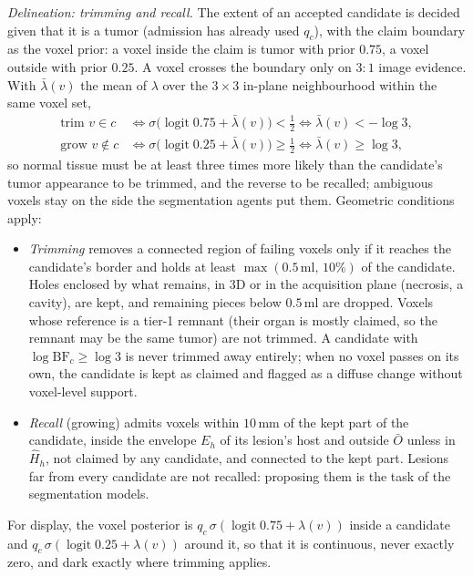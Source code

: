 \documentclass[fleqn,10pt]{olplainarticle}
\begin{document}
\textit{Delineation: trimming and recall.} The extent of an accepted candidate is decided given that it is a tumor
(admission has already used $q_c$), with the claim boundary as the voxel prior: a voxel inside the claim is tumor with
prior $0.75$, a voxel outside with prior $0.25$. A voxel crosses the boundary only on $3{:}1$ image evidence. With
$\bar\lambda(v)$ the mean of $\lambda$ over the $3\times3$ in-plane neighbourhood within the same voxel set,
\begin{equation}
\label{eq:delineation}
\begin{aligned}
\text{trim } v\in c &\iff \sigma\bigl(\operatorname{logit}0.75+\bar\lambda(v)\bigr)<\tfrac12 \iff \bar\lambda(v)<-\log3,\\
\text{grow } v\notin c &\iff \sigma\bigl(\operatorname{logit}0.25+\bar\lambda(v)\bigr)\ge\tfrac12 \iff \bar\lambda(v)\ge\log3,
\end{aligned}
\end{equation}
so normal tissue must be at least three times more likely than the candidate's tumor appearance to be trimmed, and the
reverse to be recalled; ambiguous voxels stay on the side the segmentation agents put them. Geometric conditions apply:
\begin{itemize}
\item \emph{Trimming} removes a connected region of failing voxels only if it reaches the candidate's border and holds at
least $\max(0.5\,\mathrm{ml},\,10\%)$ of the candidate. Holes enclosed by what remains, in 3D or in the acquisition plane
(necrosis, a cavity), are kept, and remaining pieces below $0.5$\,ml are dropped. Voxels whose reference is a tier-1
remnant (their organ is mostly claimed, so the remnant may be the same tumor) are not trimmed. A candidate with
$\log\mathrm{BF}_c\ge\log3$ is never trimmed away entirely; when no voxel passes on its own, the candidate is kept as
claimed and flagged as a diffuse change without voxel-level support.
\item \emph{Recall} (growing) admits voxels within $10$\,mm of the kept part of the candidate, inside the envelope $E_h$ of
its lesion's host and outside $\bar O$ unless in $\hat H_h$, not claimed by any candidate, and connected to the kept part.
Lesions far from every candidate are not recalled: proposing them is the task of the segmentation models.
\end{itemize}
For display, the voxel posterior is $q_c\,\sigma(\operatorname{logit}0.75+\lambda(v))$ inside a candidate and
$q_c\,\sigma(\operatorname{logit}0.25+\lambda(v))$ around it, so that it is continuous, never exactly zero, and dark exactly
where trimming applies.
\end{document}

